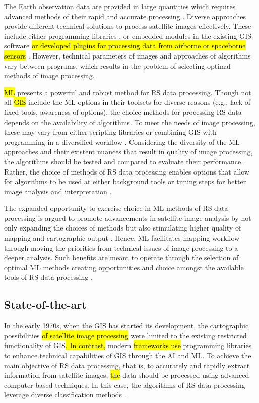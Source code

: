 \documentclass[final,5p,times,twocolumn]{elsarticle}
\numberwithin{table}{section}
\begin{document}
The Earth observation data are provided in large quantities which requires advanced methods of their rapid and accurate processing \cite{LI2023103345,YIN2021102514,HUANG20181915}. Diverse approaches provide different technical solutions to process satellite images effectively. These include either programming libraries \cite{9884758,Lemenkova202306,9297369,9553880}, or embedded\hl{ }modules in the existing GIS software \cite{Ngolo,Lemenkova202307,rs15041148} \hl{or developed plugins for processing data from airborne or spaceborne sensors} \cite{Duarte,9574057,10114939,6871809}. However, technical parameters of images and approaches of algorithms vary between programs, which results in the problem of selecting optimal methods of image processing. 

\hl{ML} presents a powerful and robust method for RS data processing. Though not all \hl{GIS} include the ML options in their toolsets for diverse reasons (e.g., lack of fixed tools, awareness of options), the choice methods for processing RS data depends on the availability of algorithms. To meet the needs of image processing, these may vary from either scripting libraries or combining GIS with programming in a diversified workflow \citep{5070195,Lemenkova202227,4736879,6049966,Lemenkova202301,6910592}. Considering the diversity of the ML approaches and their existent nuances that result in quality of image processing, the algorithms should be tested and compared to evaluate their performance. Rather, the choice of methods of RS data processing enables options that allow for algorithms to be used at either background tools or tuning steps for better image analysis and interpretation \cite{rs16010184,Lemenkova202310,rs16010127}. 

The expanded opportunity to exercise choice in ML methods of RS data processing is argued to promote advancements in satellite image analysis by not only expanding the choices of methods but also stimulating higher quality of mapping and cartographic output \cite{TSELKA2023131,Lemenkova202021,10292983}. Hence, ML facilitates mapping workflow through moving the priorities from technical issues of image processing to a deeper analysis. Such benefits are meant to operate through the selection of optimal ML methods creating opportunities and choice amongst the available tools of RS data processing \cite{WU2023110723}.

\subsection{State-of-the-art}
In the early 1970s, when the GIS\hl{ }has started its development, the cartographic possibilities \hl{of satellite image processing }were limited to the existing restricted functionality of GIS\hl{. In contrast,} modern \hl{frameworks use} programming libraries to enhance technical capabilities of GIS through the AI and ML. To achieve the main objective of RS data processing, that is, to accurately and rapidly extract information from satellite images, \hl{the} data should be processed using advanced computer-based techniques. In this case, the algorithms of RS data processing leverage diverse classification methods \cite{su151813786,Lemenkova202229}. 
\end{document}

